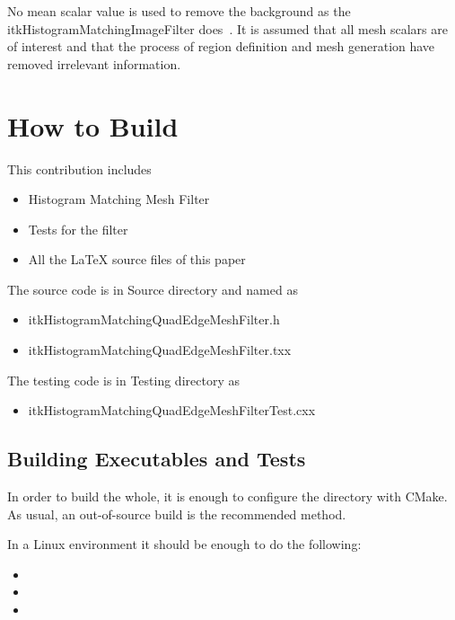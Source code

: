 \documentclass{InsightArticle}
\begin{document}
No mean scalar value is used to remove the background
as the itkHistogramMatchingImageFilter does~\cite{ITKSoftwareGuide,ITKSoftwareGuideSecondEdition}.
It is assumed that all mesh scalars are of interest and that the
process of region definition and mesh generation
have removed irrelevant information.

\section{How to Build}

This contribution includes

\begin{itemize}
\item Histogram Matching Mesh Filter
\item Tests for the filter
\item All the LaTeX source files of this paper
\end{itemize}

The source code is in Source directory and named as 

\begin{itemize}
\item itkHistogramMatchingQuadEdgeMeshFilter.h
\item itkHistogramMatchingQuadEdgeMeshFilter.txx
\end{itemize}

The testing code is in Testing directory as

\begin{itemize}
\item itkHistogramMatchingQuadEdgeMeshFilterTest.cxx
\end{itemize}

\subsection{Building Executables and Tests}

In order to build the whole, it is enough to configure the directory with
CMake. As usual, an out-of-source build is the recommended method.

In a Linux environment it should be enough to do the following:

\begin{itemize}
\item {}
\item {}
\item {}
\end{itemize}
\end{document}
